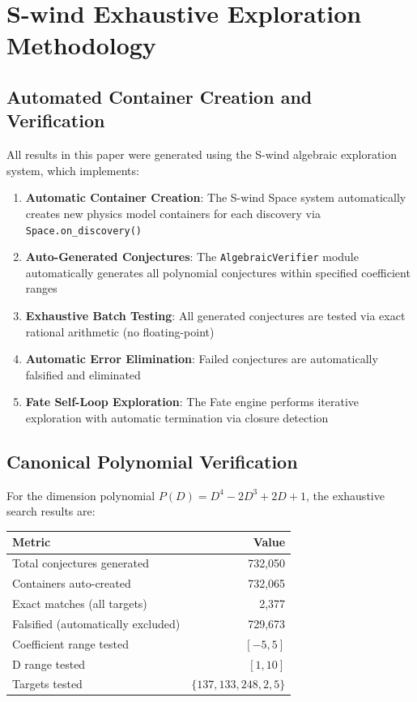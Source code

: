 \documentclass[11pt,a4paper]{article}
\begin{document}
\section{S-wind Exhaustive Exploration Methodology}

\subsection{Automated Container Creation and Verification}

All results in this paper were generated using the S-wind algebraic exploration system, which implements:

\begin{enumerate}
    \item \textbf{Automatic Container Creation}: The S-wind Space system automatically creates new physics model containers for each discovery via \texttt{Space.on\_discovery()}
    
    \item \textbf{Auto-Generated Conjectures}: The \texttt{AlgebraicVerifier} module automatically generates all polynomial conjectures within specified coefficient ranges
    
    \item \textbf{Exhaustive Batch Testing}: All generated conjectures are tested via exact rational arithmetic (no floating-point)
    
    \item \textbf{Automatic Error Elimination}: Failed conjectures are automatically falsified and eliminated
    
    \item \textbf{Fate Self-Loop Exploration}: The Fate engine performs iterative exploration with automatic termination via closure detection
\end{enumerate}

\subsection{Canonical Polynomial Verification}

For the dimension polynomial $P(D) = D^4 - 2D^3 + 2D + 1$, the exhaustive search results are:

\begin{center}
\begin{tabular}{lr}
\hline
\textbf{Metric} & \textbf{Value} \\
\hline
Total conjectures generated & 732,050 \\
Containers auto-created & 732,065 \\
Exact matches (all targets) & 2,377 \\
Falsified (automatically excluded) & 729,673 \\
Coefficient range tested & $[-5, 5]$ \\
D range tested & $[1, 10]$ \\
Targets tested & $\{137, 133, 248, 2, 5\}$ \\
\hline
\end{tabular}
\end{center}
\end{document}
